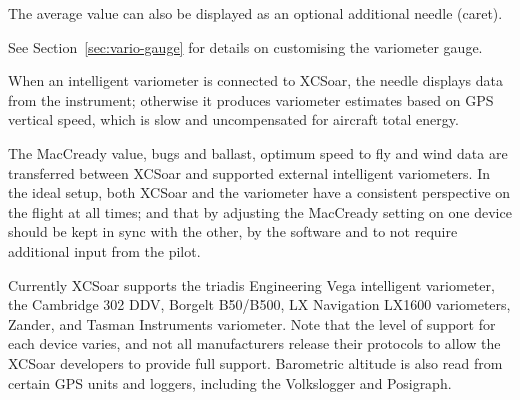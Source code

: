 \documentclass[a4paper,12pt]{refrep}
\begin{document}

The average value can also be displayed as an optional additional
needle (caret).

See Section~\ref{sec:vario-gauge} for details on customising the variometer
gauge.

When an intelligent variometer is connected to XCSoar, the needle
displays data from the instrument; otherwise it produces variometer
estimates based on GPS vertical speed, which is slow and uncompensated
for aircraft total energy.  

The MacCready value, bugs and ballast, optimum speed to fly and wind
data are transferred between XCSoar and supported external intelligent
variometers.  In the ideal setup, both XCSoar and the variometer have
a consistent perspective on the flight at all times; and that by
adjusting the MacCready setting on one device should be kept in sync
with the other, by the software and to not require additional input from
the pilot.

Currently XCSoar supports the triadis Engineering Vega intelligent
variometer, the Cambridge 302 DDV, Borgelt B50/B500, LX Navigation
LX1600 variometers, Zander, and Tasman Instruments variometer. 
Note that the level of support for each device varies, and not all
manufacturers release their protocols to allow the XCSoar developers
to provide full support.  Barometric altitude is also read from
certain GPS units and loggers, including the Volkslogger and
Posigraph.
\end{document}
